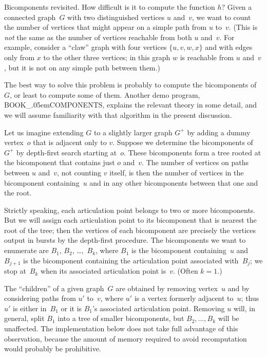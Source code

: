 \fi

Bicomponents revisited.
How difficult is it to compute the function $h$? Given a connected graph~$G$
with two distinguished vertices $u$ and~$v$, we want to count the number
of vertices that might appear on a simple path from $u$ to~$v$.
(This is {\sl not\/} the same as the number of vertices reachable from both
$u$ and~$v$. For example, consider a ``claw'' graph with four vertices
$\{u,v,w,x\}$ and with edges only from $x$ to the other three vertices;
in this graph $w$ is reachable from $u$ and~$v$, but it is not on any simple
path between them.)

The best way to solve this problem is probably to compute the bicomponents
of~$G$, or least to compute some of them. Another demo program,
{\sc BOOK\_\kern.05emCOMPONENTS}, explains the relevant theory in some
detail, and we will assume familiarity with that algorithm in the present
discussion.

Let us imagine extending $G$ to a slightly larger graph $G^+$ by
adding a dummy vertex~$o$ that is adjacent only to $v$. Suppose we determine
the bicomponents of $G^+$ by depth-first search starting at~$o$.
These bicomponents form a tree rooted at the bicomponent that contains
just $o$ and~$v$. The number of vertices on paths between $u$ and~$v$,
not counting $v$ itself, is then the number of vertices in the bicomponent
containing~$u$ and in any other bicomponents between that one and the root.

Strictly speaking, each articulation point belongs
to two or more bicomponents. But we will assign each articulation point
to its bicomponent that is nearest the root of the tree; then the vertices
of each bicomponent are precisely the vertices output in bursts by the
depth-first procedure. The bicomponents we want to enumerate are $B_1$, $B_2$,
\dots,~$B_k$, where $B_1$ is the bicomponent containing~$u$ and
$B_{j+1}$ is the bicomponent containing the articulation point associated
with~$B_j$; we stop at~$B_k$ when its associated articulation point is~$v$.
(Often $k=1$.)

The ``children'' of a given graph~$G$ are obtained by removing vertex~$u$
and by considering paths from $u'$ to~$v$, where $u'$ is a vertex
formerly adjacent to~$u$; thus $u'$ is either in~$B_1$ or it is $B_1$'s
associated articulation point. Removing $u$ will, in general, split
$B_1$ into a tree of smaller bicomponents, but $B_2,\ldots,B_k$ will be
unaffected. The implementation below does not take full advantage of this
observation, because the amount of memory required to avoid recomputation
would probably be prohibitive.

